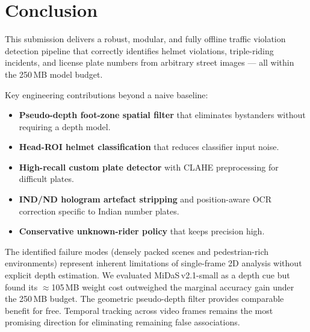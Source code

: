 \documentclass[12pt,a4paper]{article}
\begin{document}
\section{Conclusion}

This submission delivers a robust, modular, and fully offline traffic violation detection
pipeline that correctly identifies helmet violations, triple-riding incidents, and license
plate numbers from arbitrary street images — all within the 250\,MB model budget.

Key engineering contributions beyond a naive baseline:
\begin{itemize}
  \item \textbf{Pseudo-depth foot-zone spatial filter} that eliminates bystanders without
        requiring a depth model.
  \item \textbf{Head-ROI helmet classification} that reduces classifier input noise.
  \item \textbf{High-recall custom plate detector} with CLAHE preprocessing for difficult
        plates.
  \item \textbf{IND/ND hologram artefact stripping} and position-aware OCR correction
        specific to Indian number plates.
  \item \textbf{Conservative unknown-rider policy} that keeps precision high.
\end{itemize}

The identified failure modes (densely packed scenes and pedestrian-rich environments)
represent inherent limitations of single-frame 2D analysis without explicit depth
estimation. We evaluated MiDaS\,v2.1-small as a depth cue but found its
$\approx$105\,MB weight cost outweighed the marginal accuracy gain under the
250\,MB budget. The geometric pseudo-depth filter provides comparable benefit
for free. Temporal tracking across video frames remains the most promising direction
for eliminating remaining false associations.
\end{document}

